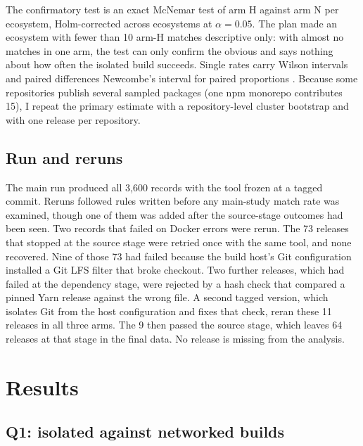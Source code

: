 \documentclass[11pt]{article}
\begin{document}
The confirmatory test is an exact McNemar test \cite{mcnemar1947} of arm H
against arm N per ecosystem, Holm-corrected \cite{holm1979} across
ecosystems at $\alpha = 0.05$. The plan made an ecosystem with fewer than
10 arm-H matches descriptive only: with almost no matches in one arm, the
test can only confirm the obvious and says nothing about how often the
isolated build succeeds. Single rates carry Wilson intervals
\cite{wilson1927} and paired differences Newcombe's interval for paired
proportions \cite{newcombe1998}. Because some repositories publish
several sampled packages (one npm monorepo contributes 15), I repeat the
primary estimate with a repository-level cluster bootstrap and with one
release per repository.

\subsection{Run and reruns}

The main run produced all 3,600 records with the tool frozen at a tagged
commit. Reruns followed rules written before any main-study match rate was
examined, though one of them was added after the source-stage outcomes
had been seen. Two records that failed on Docker errors were rerun. The
73 releases that stopped at the source stage were retried once with the
same tool, and none recovered. Nine of those 73 had failed because the
build host's Git configuration installed a Git LFS filter that broke
checkout. Two further releases, which had failed at the dependency
stage, were rejected by a hash check that compared a pinned Yarn release
against the wrong file. A second tagged version, which isolates Git from
the host configuration and fixes that check, reran these 11 releases in
all three arms. The 9 then passed the source stage, which leaves 64
releases at that stage in the final data. No release is missing from the
analysis.

\section{Results}

\subsection{Q1: isolated against networked builds}
\end{document}
